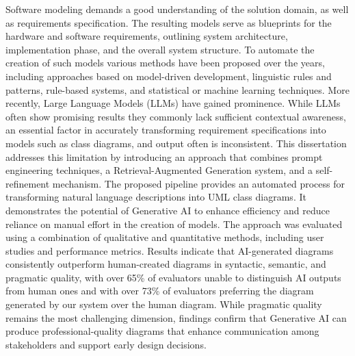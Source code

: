 
%



Software modeling demands a good understanding of the solution domain, as well as requirements specification. 
The resulting models serve as blueprints for the hardware and software requirements, outlining system architecture, implementation phase, and the overall system structure. 
To automate the creation of such models various methods have been proposed over the years, including approaches based on model-driven development, linguistic rules and patterns, rule-based systems, and statistical or machine learning techniques. 
More recently, Large Language Models (LLMs) have gained prominence. While LLMs often show promising results they commonly lack sufficient contextual awareness, an essential factor in accurately transforming requirement specifications into models such as class diagrams, and output often is inconsistent. 
This dissertation addresses this limitation by introducing an approach that combines prompt engineering techniques, a Retrieval-Augmented Generation system, and a self-refinement mechanism. 
The proposed pipeline provides an automated process for transforming natural language descriptions into UML class diagrams. 
It demonstrates the potential of Generative AI to enhance efficiency and reduce reliance on manual effort in the creation of models.
The approach was evaluated using a combination of qualitative and quantitative methods, including user studies and performance metrics. Results indicate that AI-generated diagrams consistently outperform human-created diagrams in syntactic, semantic, and pragmatic quality, with over 65\% of evaluators unable to distinguish AI outputs from human ones and with over 73\% of evaluators preferring the diagram generated by our system over the human diagram. 
While pragmatic quality remains the most challenging dimension, findings confirm that Generative AI can produce professional-quality diagrams that enhance communication among stakeholders and support early design decisions.


